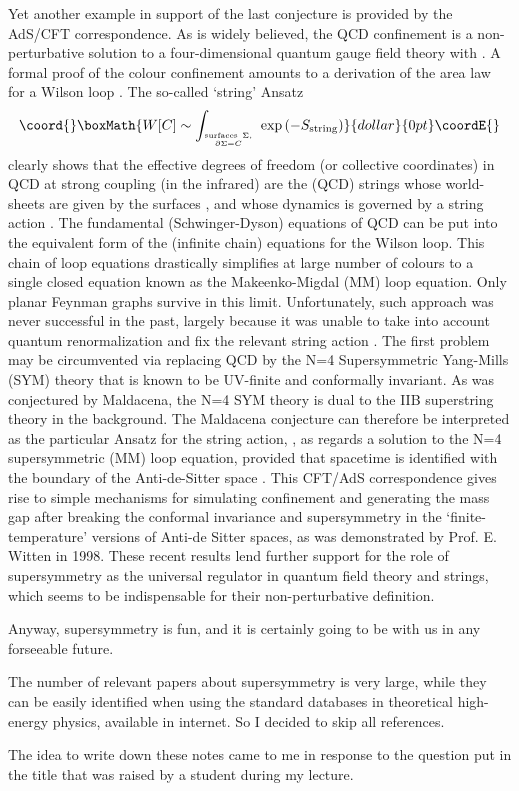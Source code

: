 \documentclass[a4paper,a4paper]{article}
\begin{document}
Yet another example in support of the last conjecture is provided by the
AdS/CFT correspondence.  As is widely believed, the QCD confinement is a 
non-perturbative solution to a four-dimensional quantum \coordHE{}  
gauge field theory with \coordHE{}. A formal proof of the colour 
confinement amounts to a derivation of the area law for a  Wilson loop \coordHE{}.
The so-called `string' Ansatz 
$$\coord{}\boxMath{ W[C] \sim \int_{{\rm surfaces~}\Sigma,\atop \partial\Sigma=C}\; 
\exp\left(-S_{\rm string}\right) }{dollar}{0pt}\coordE{}$$
clearly shows that the effective degrees of freedom (or collective 
coordinates) in QCD at strong coupling (in the infrared) are the (QCD) strings
whose world-sheets are given by the surfaces \myHighlight{$\Sigma$}\coordHE{}, and whose dynamics is 
governed by a string action \coordHE{}. The fundamental 
(Schwinger-Dyson) equations of QCD can be put into the equivalent form of the
(infinite chain) equations for the Wilson loop. This chain of loop equations 
drastically simplifies at large number of colours \coordHE{} to a 
single closed equation known as the  Makeenko-Migdal (MM) loop equation. Only
planar Feynman graphs survive in this limit. Unfortunately, such approach was
never successful in the past, largely because it was unable to take into 
account quantum renormalization and fix the relevant string action 
\coordHE{}. The first problem may be circumvented via replacing QCD by 
the N=4 Supersymmetric Yang-Mills (SYM) theory that is known to be UV-finite
 and conformally invariant. As was conjectured by Maldacena, the N=4 SYM 
theory is dual to the IIB superstring theory in the \coordHE{} 
background. The Maldacena conjecture can therefore be interpreted as the 
particular Ansatz for the string action, 
\coordHE{}, as regards a solution to the 
N=4 supersymmetric (MM) loop equation, provided that spacetime is identified 
with the boundary of the  Anti-de-Sitter space \coordHE{}. This CFT/AdS 
correspondence gives rise to simple mechanisms for simulating confinement and
generating the mass gap after breaking the conformal invariance and 
supersymmetry in the `finite-temperature' versions of Anti-de Sitter spaces,
as was demonstrated by Prof. E. Witten in 1998. These recent results lend 
further support for the role of supersymmetry as the universal regulator in
quantum field theory and strings, which seems to be indispensable for their
non-perturbative definition. 

Anyway, supersymmetry is fun, and it is certainly going to be with us in any
forseeable future.

The number of relevant papers about supersymmetry is very large, while they 
can be easily identified  when using the standard databases in theoretical 
high-energy physics, available in internet. So I decided to skip all 
references. 

The idea to write down these notes came to me in response to the question 
put in the title that was raised by a student during my lecture.
\end{document}
